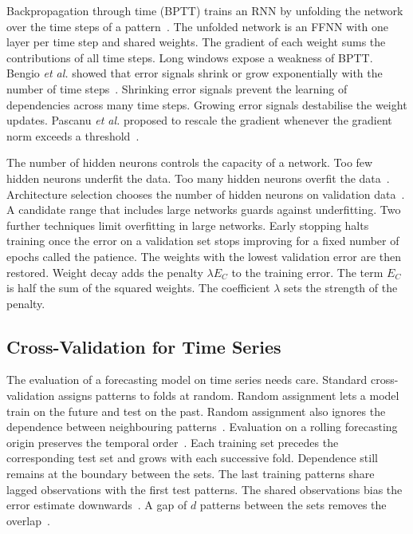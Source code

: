 \documentclass[conference,10pt]{IEEEtran}
\begin{document}
Backpropagation through time (BPTT) trains an RNN by unfolding the
network over the time steps of a pattern~\cite{werbos1990}.
The unfolded network is an FFNN with one layer per time step and shared
weights.
The gradient of each weight sums the contributions of all time steps.
Long windows expose a weakness of BPTT.
Bengio \emph{et al.} showed that error signals shrink or grow
exponentially with the number of time steps~\cite{bengio1994}.
Shrinking error signals prevent the learning of dependencies across many
time steps.
Growing error signals destabilise the weight updates.
Pascanu \emph{et al.} proposed to rescale the gradient whenever the
gradient norm exceeds a threshold~\cite{pascanu2013}.

The number of hidden neurons controls the capacity of a network.
Too few hidden neurons underfit the data.
Too many hidden neurons overfit the data~\cite{engelbrecht2007}.
Architecture selection chooses the number of hidden neurons on
validation data~\cite{engelbrecht2007}.
A candidate range that includes large networks guards against
underfitting.
Two further techniques limit overfitting in large networks.
Early stopping halts training once the error on a validation set stops
improving for a fixed number of epochs called the patience.
The weights with the lowest validation error are then restored.
Weight decay adds the penalty $\lambda E_C$ to the training error.
The term $E_C$ is half the sum of the squared weights.
The coefficient $\lambda$ sets the strength of the penalty.

\subsection{Cross-Validation for Time Series}

The evaluation of a forecasting model on time series needs care.
Standard cross-validation assigns patterns to folds at random.
Random assignment lets a model train on the future and test on the past.
Random assignment also ignores the dependence between neighbouring
patterns~\cite{bergmeir2012}.
Evaluation on a rolling forecasting origin preserves the temporal
order~\cite{hyndman2021}.
Each training set precedes the corresponding test set and grows with
each successive fold.
Dependence still remains at the boundary between the sets.
The last training patterns share lagged observations with the first test
patterns.
The shared observations bias the error estimate
downwards~\cite{racine2000}.
A gap of $d$ patterns between the sets removes the
overlap~\cite{racine2000}.
\end{document}

